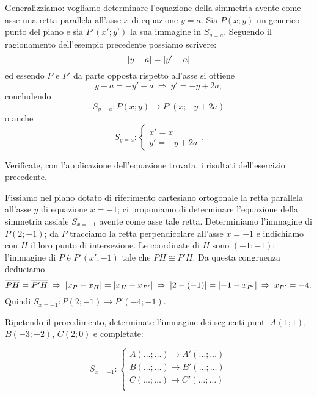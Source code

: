 Generalizziamo: vogliamo determinare l'equazione della simmetria avente come asse una retta parallela all'asse $x$ di equazione $y=a$. Sia $P(x;y)$ un generico punto del piano e sia $P'(x';y')$ la sua immagine in $S_{y=a}$. Seguendo il ragionamento dell'esempio precedente possiamo scrivere: \[\left|y-a\right| = \left|y'-a\right|\]
ed essendo $P$ e $P'$ da parte opposta rispetto all'asse si ottiene
\[y-a=-y'+a\:\Rightarrow\: y'=-y+2a;\]
concludendo
\[S_{y=a}:P(x;y)\rightarrow P'(x;-y+2a)\]
o anche
\[S_{y=a}:\begin{cases}x'=x\\ y'=-y+2a \end{cases}.\]

Verificate, con l'applicazione dell'equazione trovata, i risultati dell'esercizio precedente.

\begin{exrig}
\begin{esempio}
Fissiamo nel piano dotato di riferimento cartesiano ortogonale la retta parallela all'asse $y$ di equazione $x=-1$; ci proponiamo di determinare l'equazione della simmetria assiale $S_{x=-1}$ avente come asse tale retta. Determiniamo l'immagine di $P(2;-1)$; da $P$ tracciamo la retta perpendicolare all'asse $x=-1$ e indichiamo con $H$ il loro punto di intersezione. Le coordinate di $H$ sono $(-1;-1)$; l'immagine di $P$ è $P'(x';-1)$ tale che $PH\cong P'H$. Da questa congruenza deduciamo
\[\overline{PH}=\overline{P'H}\:\Rightarrow\:\left|x_P-x_H\right|=\left|x_H-x_{P'}\right|\:\Rightarrow\:\left|2-(-1)\right|=\left|-1-x_{P'}\right|\:\Rightarrow\:x_{P'}=-4.\]
Quindi $S_{x=-1}:P(2;-1)\rightarrow P'(-4;-1)$.

\begin{figure*}[!htb]
	\centering
\end{figure*}

Ripetendo il procedimento, determinate l'immagine dei seguenti punti $A(1;1)$, $B(-3;-2)$, $C(2;0)$ e completate:

\[S_{x=-1}:\begin{cases}A(\ldots{};\ldots{}) \rightarrow A'(\ldots{};\ldots{})\\
B(\ldots{};\ldots{}) \rightarrow B'(\ldots{};\ldots{})\\
C(\ldots{};\ldots{}) \rightarrow C'(\ldots{};\ldots{})\\ \end{cases}\]
\end{esempio}
\end{exrig}

